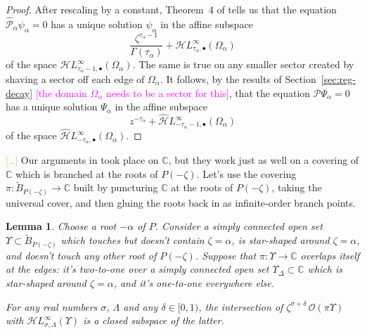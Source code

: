 \documentclass{article}
\newcommand{\singexp}[2]{\mathcal{H}L^\infty_{#1, #2}}
\newcommand{\singexpalg}[1]{\singexp{#1}{\bullet}}
\newcommand{\dualsingexp}[2]{\widehat{\mathcal{H}}L^\infty_{#1, #2}}
\newcommand{\dualsingexpalg}[1]{\dualsingexp{#1}{\bullet}}
\newcommand{\maps}{\colon}
\newcommand{\C}{\mathbb{C}}
\theoremstyle{definition}
\theoremstyle{plain}
\newtheorem{lemma}[definition]{Lemma}
\begin{document}
\begin{proof}
After rescaling by a constant, Theorem~4 of \cite{reg-sing-volterra} tells us that the equation $\hat{\mathcal{P}}_\alpha \psi_\alpha = 0$ has a unique solution $\psi_\alpha$ in the affine subspace
\[ \frac{\zeta^{\tau_\alpha-1}}{\Gamma(\tau_\alpha)} + \singexpalg{\tau_\alpha}(\Omega_\alpha) \]
of the space $\singexpalg{\tau_\alpha-1}(\Omega_\alpha)$. The same is true on any smaller sector created by shaving a sector off each edge of $\Omega_\alpha$. It follows, by the results of Section~\ref{sec:reg-decay} \textcolor{magenta}{[the domain $\Omega_\alpha$ needs to be a sector for this]}, that the equation $\mathcal{P}\Psi_\alpha = 0$ has a unique solution $\Psi_\alpha$ in the affine subspace
\[ z^{-\tau_\alpha} + \dualsingexpalg{-\tau_\alpha-1}(\Omega_\alpha) \]
of the space $\dualsingexpalg{-\tau_\alpha}(\Omega_\alpha)$.
\end{proof}
\textcolor{orange}{[\ldots]} Our arguments in \cite{reg-sing-volterra} took place on $\C$, but they work just as well on a covering of $\C$ which is branched at the roots of $P(-\zeta)$. Let's use the covering $\pi \maps \widetilde{B}_{P(-\zeta)} \to \C$ built by puncturing $\C$ at the roots of $P(-\zeta)$, taking the universal cover, and then gluing the roots back in as infinite-order branch points.
\begin{lemma}\label{lem:shifted_holo_closed}
Choose a root $-\alpha$ of $P$. Consider a simply connected open set $\Upsilon \subset \widetilde{B}_{P(-\zeta)}$ which touches but doesn't contain $\zeta = \alpha$, is star-shaped around $\zeta = \alpha$, and doesn't touch any other root of $P(-\zeta)$. Suppose that $\pi \maps \Upsilon \to \C$ overlaps itself at the edges: it's two-to-one over a simply connected open set $\Upsilon_\Delta \subset \C$ which is star-shaped around $\zeta = \alpha$, and it's one-to-one everywhere else.
\begin{center}
\end{center}
For any real numbers $\sigma$, $\Lambda$ and any $\delta \in [0, 1)$, the intersection of $\zeta^{\sigma + \delta}\,\mathcal{O}(\pi \Upsilon)$ with $\singexp{\sigma}{\Lambda}(\Upsilon)$ is a closed subspace of the latter.
\end{lemma}
\end{document}
